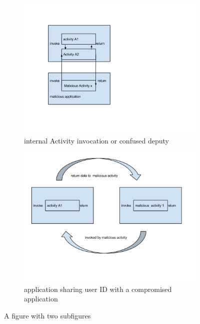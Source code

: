 \documentclass[11pt]{report}
\begin{document}
\begin{figure}
\centering
\begin{subfigure}{.5\textwidth}
  \centering
  \includegraphics[width=1\linewidth]{./images/a1.png}
  \caption{internal Activity invocation or confused deputy}
  \label{fig:sub1}
\end{subfigure}%
\begin{subfigure}{.5\textwidth}
  \centering
  \includegraphics[width=1\linewidth]{./images/a2.png}
  \caption{application sharing user ID with a compromised application}
  \label{fig:sub2}
\end{subfigure}
\caption{A figure with two subfigures}
\label{fig:test}
\end{figure}
\end{document}
